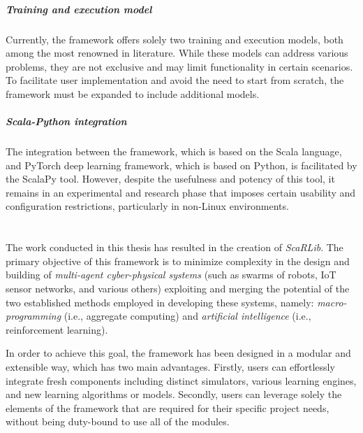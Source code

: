 \documentclass[12pt,a4paper,openright,twoside]{book}
\begin{document}
\paragraph{Training and execution model} 
Currently, the framework offers solely two training and execution models, both among the most renowned in literature. 
    While these models can address various problems, they are not exclusive and may limit functionality in certain scenarios. 
    To facilitate user implementation and avoid the need to start from scratch, the framework must be expanded 
    to include additional models.

\paragraph{Scala-Python integration}
The integration between the framework, which is based on the Scala language, and PyTorch deep learning framework, 
    which is based on Python, is facilitated by the ScalaPy tool. However, despite the usefulness and potency of this tool, 
    it remains in an experimental and research phase that imposes certain usability and configuration restrictions, particularly 
    in non-Linux environments.

\chapter{\conclusionsname}
\label{chap:conclusions}
The work conducted in this thesis has resulted in the creation of \emph{ScaRLib}. The primary objective of this framework is to minimize complexity 
    in the design and building of \emph{multi-agent cyber-physical systems} (such as swarms of robots, IoT sensor networks, and various others) 
    exploiting and merging the potential of the two established methods employed in developing these systems, 
    namely: \emph{macro-programming} (i.e., aggregate computing) and \emph{artificial intelligence} (i.e., reinforcement learning).

In order to achieve this goal, the framework has been designed in a modular and extensible way, which has two main advantages.
    Firstly, users can effortlessly integrate fresh components including distinct simulators, various learning engines, and new learning algorithms or models.
    Secondly, users can leverage solely the elements of the framework that are required for their 
    specific project needs, without being duty-bound to use all of the modules.
\end{document}
